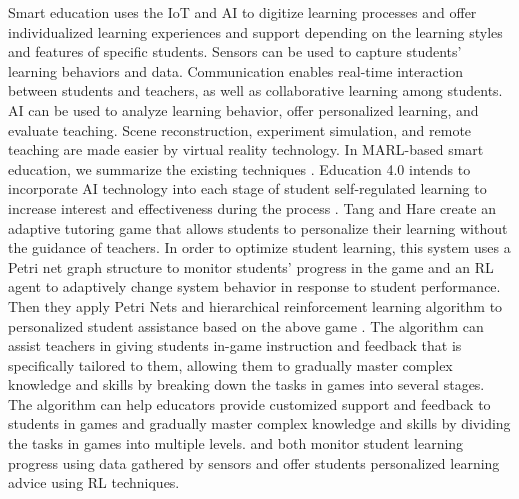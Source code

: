 \documentclass[acmsmall]{acmart}
\begin{document}
Smart education uses the IoT and AI to digitize learning processes and offer individualized learning experiences and support depending on the learning styles and features of specific students. Sensors can be used to capture students' learning behaviors and data. Communication enables real-time interaction between students and teachers, as well as collaborative learning among students. 
AI can be used to analyze learning behavior, offer personalized learning, and evaluate teaching. Scene reconstruction, experiment simulation, and remote teaching are made easier by virtual reality technology.
In MARL-based smart education, we summarize the existing techniques \cite{asee_peer_40052, 9970680, 8615217, fu2022reinforcement}. 
Education 4.0 intends to incorporate AI technology into each stage of student self-regulated learning to increase interest and effectiveness during the process \cite{HADERER20221328, SCHUMACHER2021100791, 8990763}. 
Tang and Hare \cite{asee_peer_40052} create an adaptive tutoring game that allows students to personalize their learning without the guidance of teachers. In order to optimize student learning, this system uses a Petri net graph structure to monitor students' progress in the game and an RL agent to adaptively change system behavior in response to student performance.
Then they apply Petri Nets and hierarchical reinforcement learning algorithm to personalized student assistance based on the above game \cite{9970680}. The algorithm can assist teachers in giving students in-game instruction and feedback that is specifically tailored to them, allowing them to gradually master complex knowledge and skills by breaking down the tasks in games into several stages. The algorithm can help educators provide customized support and feedback to students in games and gradually master complex knowledge and skills by dividing the tasks in games into multiple levels. \cite{8615217} and \cite{fu2022reinforcement} both monitor student learning progress using data gathered by sensors and offer students personalized learning advice using RL techniques. 
\end{document}
